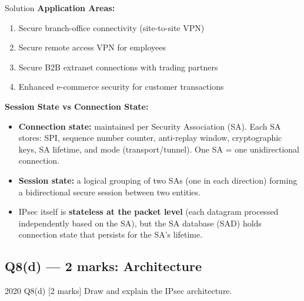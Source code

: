 \documentclass[12pt,a4paper]{article}
\begin{document}
\begin{solbox}{Solution}
\textbf{Application Areas:}
\begin{enumerate}[nosep]
  \item Secure branch-office connectivity (site-to-site VPN)
  \item Secure remote access VPN for employees
  \item Secure B2B extranet connections with trading partners
  \item Enhanced e-commerce security for customer transactions
\end{enumerate}

\bigskip
\textbf{Session State vs Connection State:}
\begin{itemize}[nosep]
  \item \textbf{Connection state:} maintained per Security Association (SA). Each SA stores: SPI, sequence number counter, anti-replay window, cryptographic keys, SA lifetime, and mode (transport/tunnel). One SA = one unidirectional connection.
  \item \textbf{Session state:} a logical grouping of two SAs (one in each direction) forming a bidirectional secure session between two entities.
  \item IPsec itself is \textbf{stateless at the packet level} (each datagram processed independently based on the SA), but the SA database (SAD) holds connection state that persists for the SA's lifetime.
\end{itemize}
\end{solbox}

\vspace{1em}

\subsection{Q8(d) --- 2 marks: Architecture}

\begin{qbox}{2020 Q8(d) [2 marks]}
  Draw and explain the IPsec architecture.
\end{qbox}
\end{document}
